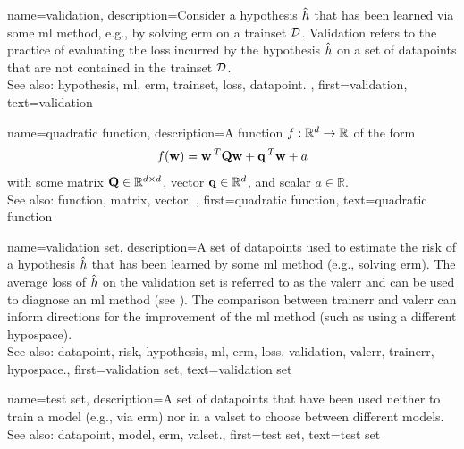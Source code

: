 {name={validation},
	description={Consider a \gls{hypothesis} $\hat{h}$ that has been 
		learned via some \gls{ml} method, e.g., by solving \gls{erm} on a \gls{trainset} $\mathcal{D}$. 
		Validation refers to the practice of evaluating the \gls{loss} incurred by the 
		\gls{hypothesis} $\hat{h}$ on a set of 
		\glspl{datapoint} that are not contained in the \gls{trainset} $\mathcal{D}$.
				\\
		See also: \gls{hypothesis}, \gls{ml}, \gls{erm}, \gls{trainset}, \gls{loss}, \gls{datapoint}. },
	first={validation},
	text={validation}  
}

{name={quadratic function},
	description={A \gls{function} $f: \mathbb{R}^{d} \rightarrow \mathbb{R}$ of the form 
		$$f({\bf w}) =  {\bf w}\,^{T} \mathbf{Q} \mathbf{w} + \mathbf{q}\,^{T} {\bf w}+a$$ with 
		some \gls{matrix} $\mathbf{Q} \in \mathbb{R}^{d \times d}$, \gls{vector} ${\bf q} \in \mathbb{R}^{d}$, 
		and scalar $a \in \mathbb{R}$.
		\\
		See also: \gls{function}, \gls{matrix}, \gls{vector}. },
	first={quadratic function},
	text={quadratic function}  
}

{name={validation set},
 	description={A set of \glspl{datapoint} used to estimate 
  		the \gls{risk} of a \gls{hypothesis} $\hat{h}$ that has been learned by some 
  		\gls{ml} method (e.g., solving \gls{erm}). The average \gls{loss} of $\hat{h}$ 
  		on the \gls{validation} set is referred to as the \gls{valerr} and can be used to diagnose an 
  		\gls{ml} method (see \cite[Sec. 6.6]{MLBasics}). The comparison between \gls{trainerr} 
  		and \gls{valerr} can inform directions for the improvement of the \gls{ml} method (such as 
  		using a different \gls{hypospace}).
			\\
		See also: \gls{datapoint}, \gls{risk}, \gls{hypothesis}, \gls{ml}, \gls{erm}, \gls{loss}, \gls{validation}, \gls{valerr}, \gls{trainerr}, \gls{hypospace}.},
	first={validation set},
	text={validation set}  
}

{name={test set},
	description={A set of \glspl{datapoint} that have  
		been used neither to train a \gls{model} (e.g., via \gls{erm}) nor in a \gls{valset} 
		to choose between different \glspl{model}.
				\\
		See also: \gls{datapoint}, \gls{model}, \gls{erm}, \gls{valset}.},
	first={test set},
	text={test set}  
}


